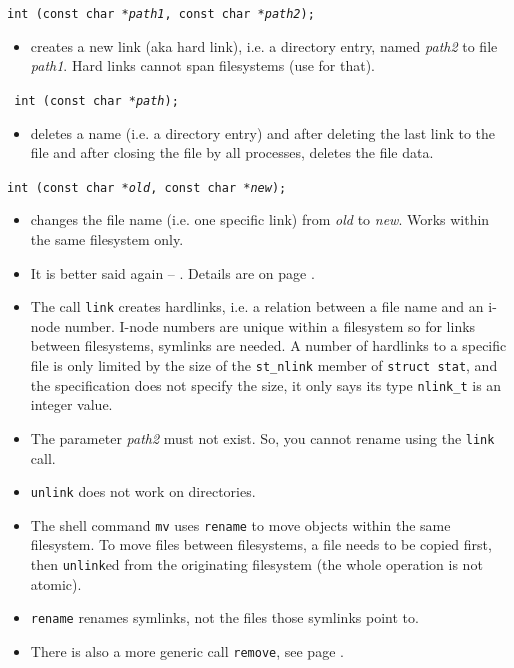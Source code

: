 \begin{slide}
\texttt{int (const char *\emph{path1}, const char *\emph{path2});}
\begin{itemize}
\item creates a new link (aka hard link), i.e. a directory entry, named
\emph{path2} to file \emph{path1}.  Hard links cannot span filesystems (use
 for that).
\end{itemize}
 \texttt{ int (const char *\emph{path});}
\begin{itemize}
\item deletes a name (i.e. a directory entry) and after deleting the last link to
the file and after closing the file by all processes, deletes the file data.
\end{itemize}
\texttt{int (const char *\emph{old}, const char *\emph{new});}
\begin{itemize}
\item changes the file name (i.e. one specific link) from \emph{old} to
\emph{new}.  Works within the same filesystem only.
\end{itemize}
\end{slide}

\begin{itemize}
\item It is better said again -- .  Details are on page \pageref{FILEDELETE}.
\item The call \texttt{link} creates hardlinks, i.e. a relation between a file
name and an i-node number.  I-node numbers are unique within a filesystem so for
links between filesystems, symlinks are needed.  A number of hardlinks to a
specific file is only limited by the size of the \texttt{st\_nlink} member of
\texttt{struct stat}, and the specification does not specify the size, it only
says its type \texttt{nlink\_t} is an integer value.
\item The parameter \emph{path2} must not exist.  So, you cannot rename using
the \texttt{link} call.
\item \texttt{unlink} does not work on directories.
\item The shell command \texttt{mv} uses \texttt{rename} to move objects within
the same filesystem.  To move files between filesystems, a file needs to be
copied first, then \texttt{unlink}ed from the originating filesystem (the whole
operation is not atomic).
\item \texttt{rename} renames symlinks, not the files those symlinks point to.
\item There is also a more generic call \texttt{remove}, see page
\pageref{REMOVE}.
\end{itemize}

